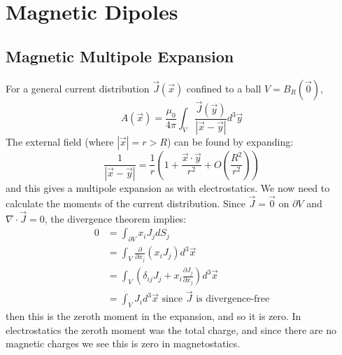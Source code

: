 \documentclass[../Main.tex]{subfiles}
\begin{document}
\section{Magnetic Dipoles}
\subsection{Magnetic Multipole Expansion}
For a general current distribution $\vec{J}(\vec{x})$ confined to a ball $V = B_R(\vec0)$, 
\begin{equation*}
    A(\vec{x}) = \frac{\mu_0}{4\pi} \int_V \frac{\vec{J}(\vec{y})}{|\vec{x} - \vec{y}|} d^3 \vec{y}
\end{equation*}
The external field (where $|\vec{x}| = r > R$) can be found by expanding:
\begin{equation*}
    \frac{1}{|\vec{x} - \vec{y}|} = \frac1r \left(1 + \frac{\vec{x} \cdot \vec{y}}{r^2} + O\left(\frac{R^2}{r^2}\right)\right)
\end{equation*}
and this gives a multipole expansion as with electrostatics. We now need to calculate the moments of the current distribution. Since $\vec{J} = \vec{0}$ on $\partial V$ and $\nabla \cdot \vec{J} = 0$, the divergence theorem implies:
\begin{align*}
    0 &= \int_{\partial V} x_i J_j dS_j \\
    &= \int_{V} \frac{\partial}{\partial x_j} (x_i J_j) d^3 \vec{x} \\
    &= \int_{V} (\delta_{ij} J_j + x_i \frac{\partial J_j}{\partial x_j}) d^3 \vec{x} \\
    &= \int_{V} J_i d^3 \vec{x} \text{ since $\vec{J}$ is divergence-free}
\end{align*}
then this is the zeroth moment in the expansion, and so it is zero. In electrostatics the zeroth moment was the total charge, and since there are no magnetic charges we see this is zero in magnetostatics.
\end{document}
